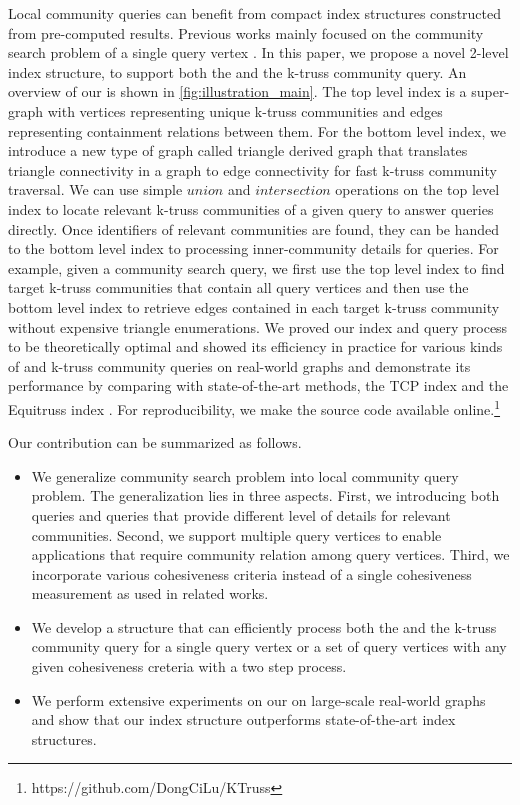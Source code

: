 Local community queries can benefit from compact index structures constructed from pre-computed results. Previous works mainly focused on the community search problem of a single query vertex \cite{huang2014querying, akbas2017truss}. In this paper, we propose a novel 2-level index structure, to support both the \toplevelprob{} and the \bottomlevelprob{} k-truss community query. An overview of our \twolevelindex{} is shown in \autoref{fig:illustration_main}. The top level index is a super-graph with vertices representing unique k-truss communities and edges representing containment relations between them. For the bottom level index, we introduce a new type of graph called triangle derived graph that translates triangle connectivity in a graph to edge connectivity for fast k-truss community traversal. We can use simple $union$ and $intersection$ operations on the top level index to locate relevant k-truss communities of a given query to answer \toplevelprob{} queries directly. Once identifiers of relevant communities are found, they can be handed to the bottom level index to processing inner-community details for \bottomlevelprob{} queries.
For example, given a community search query, we first use the top level index to find target k-truss communities that contain all query vertices and then use the bottom level index to retrieve edges contained in each target k-truss community without expensive triangle enumerations. We proved our index and query process to be theoretically optimal and showed its efficiency in practice for various kinds of \toplevelprob{} and \bottomlevelprob{} k-truss community queries on real-world graphs and demonstrate its performance by comparing with state-of-the-art methods, the TCP index \cite{huang2014querying} and the Equitruss index \cite{akbas2017truss}. For reproducibility, we make the source code available online.\footnote{https://github.com/DongCiLu/KTruss}

Our contribution can be summarized as follows.
\begin{itemize}
	\item We generalize community search problem into local community query problem. The generalization lies in three aspects. First, we introducing both \toplevelprob{} queries and \bottomlevelprob{} queries that provide different level of details for relevant communities. Second, we support multiple query vertices to enable applications that require community relation among query vertices. Third, we incorporate various cohesiveness criteria instead of a single cohesiveness measurement as used in related works.
	\item We develop a \twolevelindex{} structure that can efficiently process both the \toplevelprob{} and the \bottomlevelprob{} k-truss community query for a single query vertex or a set of query vertices with any given cohesiveness creteria with a two step process.
	\item We perform extensive experiments on our \twolevelindex{} on large-scale real-world graphs and show that our index structure outperforms state-of-the-art index structures. 
\end{itemize}

